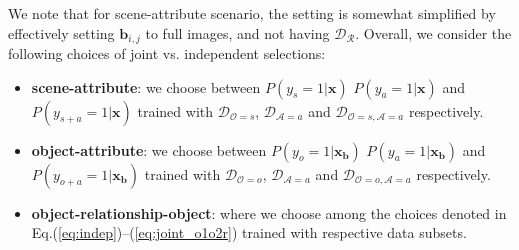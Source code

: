 \documentclass[runningheads]{llncs}
\makeatletter
\newcommand*{\ie}{{\em i.e.}\@\xspace}
\makeatother
\begin{document}
We note that for scene-attribute scenario, the setting is somewhat simplified by effectively setting $\mathbf{b}_{i,j}$ to full images, and not having $\mathcal{D}_{\mathcal{R}}$.
Overall, we consider the following choices of joint vs. independent selections:
%
%
%
%
\vspace{-0.05in}
\begin{itemize}
\item {\bf scene-attribute}: we choose between $P(y_{s}=1|\mathbf{x})$
$P(y_{a}=1|\mathbf{x})$ and 
$P(y_{s+a}=1|\mathbf{x})$ trained with 
$\mathcal{D}_{\mathcal{O}=s}$, $\mathcal{D}_{\mathcal{A}=a}$
and $\mathcal{D}_{\mathcal{O}=s, \mathcal{A}=a}$ respectively.
\vspace{0.05in}
\item {\bf object-attribute}: we choose between $P(y_{o}=1|\mathbf{x}_{\mathbf{b}})$
$P(y_{a}=1|\mathbf{x}_{\mathbf{b}})$ and 
$P(y_{o+a}=1|\mathbf{x}_{\mathbf{b}})$ trained with 
$\mathcal{D}_{\mathcal{O}=o}$, $\mathcal{D}_{\mathcal{A}=a}$
and $\mathcal{D}_{\mathcal{O}=o, \mathcal{A}=a}$ respectively.
\vspace{0.05in}
\item {\bf object-relationship-object}: where we choose among the choices denoted in Eq.(\ref{eq:indep})--(\ref{eq:joint_o1o2r}) trained with respective data subsets. 
\end{itemize}
\end{document}
